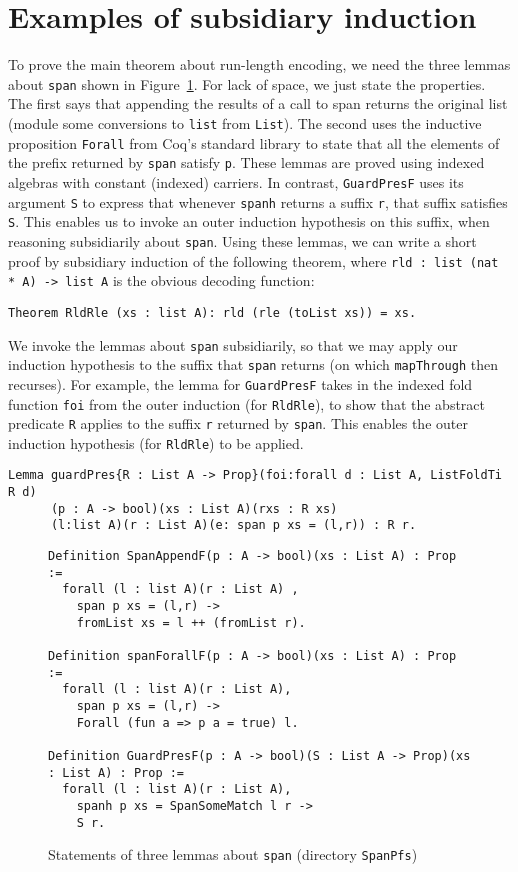 \documentclass[a4paper,USenglish]{lipics-v2021}
\begin{document}
\section{Examples of subsidiary induction}
\label{sec:examplesi}

To prove the main theorem about run-length encoding, we need
the three lemmas about \verb|span| shown in Figure~\ref{fig:spanlem}.
For lack of space, we just state the properties.  The first says that
appending the results of a call to span returns the original list
(module some conversions to \verb|list| from \verb|List|).  The second
uses the inductive proposition \verb|Forall| from Coq's standard library to
state that all the elements of the prefix returned by \verb|span|
satisfy \verb|p|.  These lemmas are proved using indexed algebras with
constant (indexed) carriers.  In contrast, \verb|GuardPresF| uses its
argument \verb|S| to express that whenever \verb|spanh| returns a
suffix \verb|r|, that suffix satisfies \verb|S|.  This enables us to
invoke an outer induction hypothesis on this suffix, when reasoning
subsidiarily about \verb|span|.  Using these lemmas, we can write a
short proof by subsidiary induction of the following theorem, where
\verb|rld : list (nat * A) -> list A| is the obvious decoding
function:

\begin{verbatim}
Theorem RldRle (xs : list A): rld (rle (toList xs)) = xs.  
\end{verbatim}

\noindent We invoke the lemmas about \verb|span| subsidiarily,
so that we may apply our induction hypothesis to the suffix
that \verb|span| returns (on which \verb|mapThrough| then recurses).
For example, the lemma for \verb|GuardPresF| takes in the
indexed fold function \verb|foi| from the outer induction (for \verb|RldRle|),
to show that the abstract predicate \verb|R| applies to the suffix
\verb|r| returned by \verb|span|.  This enables the outer induction
hypothesis (for \verb|RldRle|) to be applied.

\begin{verbatim}
Lemma guardPres{R : List A -> Prop}(foi:forall d : List A, ListFoldTi R d)
      (p : A -> bool)(xs : List A)(rxs : R xs)
      (l:list A)(r : List A)(e: span p xs = (l,r)) : R r.
\end{verbatim} 

\begin{figure}
\begin{verbatim}
Definition SpanAppendF(p : A -> bool)(xs : List A) : Prop :=
  forall (l : list A)(r : List A) ,
    span p xs = (l,r) ->
    fromList xs = l ++ (fromList r).

Definition spanForallF(p : A -> bool)(xs : List A) : Prop :=
  forall (l : list A)(r : List A),
    span p xs = (l,r) ->
    Forall (fun a => p a = true) l.

Definition GuardPresF(p : A -> bool)(S : List A -> Prop)(xs : List A) : Prop :=
  forall (l : list A)(r : List A),
    spanh p xs = SpanSomeMatch l r ->
    S r.
\end{verbatim}
\caption{Statements of three lemmas about \texttt{span} (directory \texttt{SpanPfs})}
\label{fig:spanlem}
\end{figure}
\end{document}
